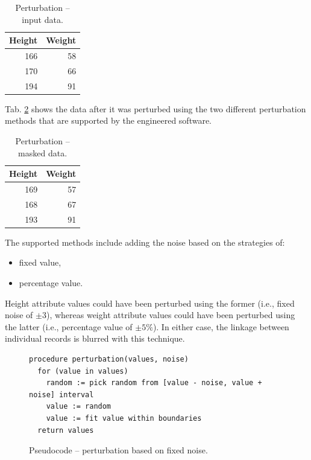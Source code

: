 \documentclass[a4paper,twoside,12pt]{book}
\begin{document}
\begin{table}%
\centering
\caption{Perturbation – input data.}
\label{id:tab:perturbation_raw}
\begin{tabular}{rr}
\toprule
Height & Weight \\ \midrule
166                        & 58                         \\
170                        & 66                         \\
194                        & 91                        \\ \bottomrule
\end{tabular}
\end{table}

Tab. \ref{id:tab:perturbation} shows the data after it was perturbed using the two different perturbation methods that are supported by the engineered software.

\begin{table}%
\centering
\caption{Perturbation – masked data.}
\label{id:tab:perturbation}
\begin{tabular}{rr}
\toprule
Height & Weight \\ \midrule
169                        & 57                         \\
168                        & 67                         \\
193                        & 91                        \\ \bottomrule
\end{tabular}
\end{table}

The supported methods include adding the noise based on the strategies of:
\begin{itemize}
\item fixed value,
\item percentage value.
\end{itemize}

Height attribute values could have been perturbed using the former (i.e., fixed noise of $\pm 3$), whereas weight attribute values could have been perturbed using the latter (i.e., percentage value of $\pm 5 \%$). In either case, the linkage between individual records is blurred with this technique. 

\begin{figure}[H]
\begin{verbatim}
procedure perturbation(values, noise)
  for (value in values)
    random := pick random from [value - noise, value + noise] interval
    value := random
    value := fit value within boundaries
  return values
\end{verbatim}
\caption{Pseudocode – perturbation based on fixed noise.}
\label{fig:code:perturbation_fixed}
\end{figure}
\end{document}
